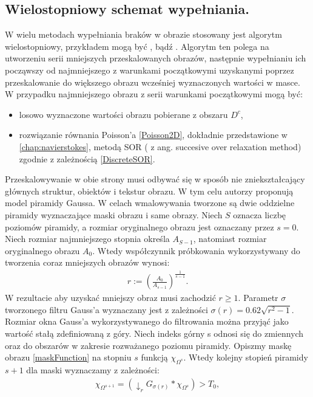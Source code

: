 \documentclass[12pt, twoside, openany]{report}
\theoremstyle{definition}
\begin{document}
\subsection{Wielostopniowy schemat wypełniania.}
W wielu metodach wypełniania braków w obrazie stosowany jest algorytm wielostopniowy, przykładem mogą być \cite{kawai2009image}, \cite{komodakis2007image} bądź \cite{wexler2007space}. Algorytm ten polega na utworzeniu serii mniejszych przeskalowanych obrazów, następnie wypełnianiu ich począwszy od najmniejszego z warunkami początkowymi uzyskanymi poprzez przeskalowanie do większego obrazu wcześniej wyznaczonych wartości w masce. W przypadku najmniejszego obrazu z serii warunkami początkowymi mogą być:
\begin{itemize}
\item
losowo wyznaczone wartości obrazu pobierane z obszaru $D^c$,
\item
rozwiązanie równania Poisson'a \eqref{Poisson2D}, dokładnie przedstawione w \autoref{chap:navierstokes}, metodą SOR ( z ang. succesive over relaxation method) zgodnie z zależnością \eqref{DiscreteSOR}.
\end{itemize}
Przeskalowywanie w obie strony musi odbywać się w sposób nie zniekształcający głównych struktur, obiektów i tekstur obrazu. W tym celu autorzy \cite{arias2011variational} proponują model piramidy Gaussa. W celach wmalowywania tworzone są dwie oddzielne piramidy wyznaczające maski obrazu i same obrazy. Niech $S$ oznacza liczbę poziomów piramidy, a rozmiar oryginalnego obrazu jest oznaczany przez $s=0$. Niech rozmiar najmniejszego stopnia określa $A_{S-1}$, natomiast rozmiar oryginalnego obrazu $A_{0}$. Wtedy współczynnik próbkowania wykorzystywany do tworzenia coraz mniejszych obrazów wynosi:
\begin{align}
r := \left(\frac{A_0}{A_{s-1}}\right)^\frac{1}{s-1}.
\end{align}
W rezultacie aby uzyskać mniejszy obraz musi zachodzić $r \geq 1$. Parametr $\sigma$ tworzonego filtru Gauss'a wyznaczany jest z zależności $\sigma(r)=0.62\sqrt{r^2-1}$. Rozmiar okna Gauss'a wykorzystywanego do filtrowania można przyjąć jako wartość stałą zdefiniowaną z góry. Niech indeks górny s odnosi się do zmiennych oraz do obszarów w zakresie rozważanego poziomu piramidy. Opiszmy maskę obrazu \eqref{maskFunction} na stopniu $s$ funkcją $\chi_{\Omega^{s}}$. Wtedy kolejny stopień piramidy $s+1$ dla maski  wyznaczamy z zależności:
\begin{align}
\chi_{\Omega^{s+1}}=(\downarrow_r G_{\sigma(r)} \ast \chi_{\Omega^s}) > T_{0},
\end{align}
\end{document}
